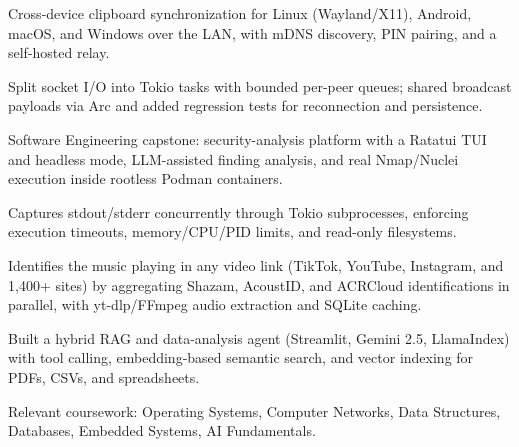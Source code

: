 \begin{cvbullets}
  \item Cross-device clipboard synchronization for Linux (Wayland/X11), Android, macOS, and Windows over the LAN, with mDNS discovery, PIN pairing, and a self-hosted relay.
  \item Split socket I/O into Tokio tasks with bounded per-peer queues; shared broadcast payloads via Arc and added regression tests for reconnection and persistence.
\end{cvbullets}

\begin{cvbullets}
  \item Software Engineering capstone: security-analysis platform with a Ratatui TUI and headless mode, LLM-assisted finding analysis, and real Nmap/Nuclei execution inside rootless Podman containers.
  \item Captures stdout/stderr concurrently through Tokio subprocesses, enforcing execution timeouts, memory/CPU/PID limits, and read-only filesystems.
\end{cvbullets}

\begin{cvbullets}
  \item Identifies the music playing in any video link (TikTok, YouTube, Instagram, and 1,400+ sites) by aggregating Shazam, AcoustID, and ACRCloud identifications in parallel, with yt-dlp/FFmpeg audio extraction and SQLite caching.
\end{cvbullets}

\begin{cvbullets}
  \item Built a hybrid RAG and data-analysis agent (Streamlit, Gemini 2.5, LlamaIndex) with tool calling, embedding-based semantic search, and vector indexing for PDFs, CSVs, and spreadsheets.
\end{cvbullets}

Relevant coursework: Operating Systems, Computer Networks, Data Structures, Databases, Embedded Systems, AI Fundamentals.



